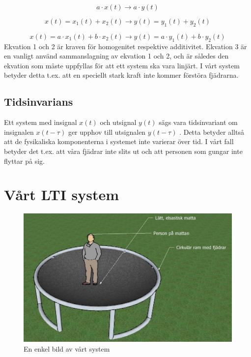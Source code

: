 \documentclass[10pt,a4paper]{article}
\begin{document}
\begin{equation}
a \cdot x(t) \rightarrow a \cdot y(t) 
\end{equation}

\begin{equation}
x(t) = x_1(t) + x_2(t) \rightarrow y(t) = y_1(t) + y_2(t)
\end{equation}

\begin{equation}
x(t) = a \cdot x_1(t) + b \cdot x_2(t)\rightarrow y(t) = a \cdot y_1(t) + b \cdot y_2(t)
\end{equation}
\linebreak
Ekvation 1 och 2 är kraven för homogenitet respektive additivitet. Ekvation 3 är en vanligt använd sammanslagning av ekvation 1 och 2, och är således den ekvation som måste uppfyllas för att ett system ska vara linjärt. \cite{sune2000}
I vårt system betyder detta t.ex. att en speciellt stark kraft inte kommer förstöra fjädrarna.


\subsection{Tidsinvarians}


Ett system med insignal $x(t)$ och utsignal $y(t)$ sägs vara tidsinvariant om insignalen $x(t - \tau)$ ger upphov till utsignalen $y(t - \tau)$ \cite{sune2000}. Detta betyder alltså att de fysikaliska komponenterna i systemet inte varierar över tid. I vårt fall betyder det t.ex. att våra fjädrar inte slits ut och att personen som gungar inte flyttar på sig. 

\newpage
\section{Vårt LTI system}

\begin{figure}[ht]
\caption{En enkel bild av vårt system}
\includegraphics[scale=0.8]{Bild2}
\end{figure}
\clearpage
\end{document}
